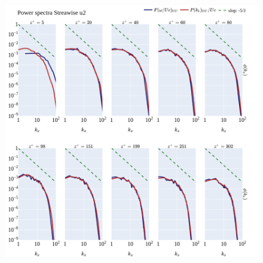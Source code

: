 \documentclass[]{article}
\theoremstyle{plain}
\theoremstyle{remark}
\begin{document}
\begin{figure}[h!]
	\begin{center}
		\includegraphics[width=\textwidth]{../output/channel_wrles_retau395/split_time/frozen_turbulence/power_spectra/u2_all.png}
	\end{center}
\end{figure}
\end{document}
